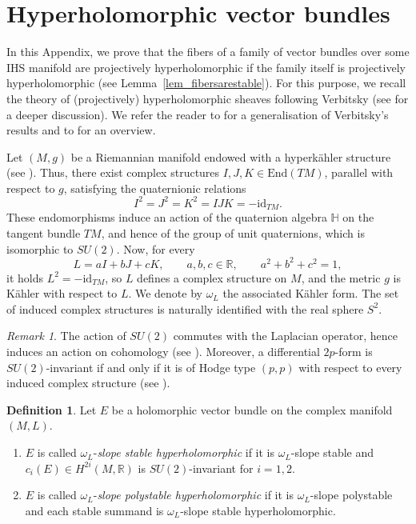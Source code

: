 \documentclass[12pt,a4paper]{amsart}
\theoremstyle{plain}
\theoremstyle{definition}
\newtheorem{df}[thm]{Definition}
\theoremstyle{remark}
\newtheorem{rmk}[thm]{Remark}
\def\id{\mathrm{id}}
\def\End{\mathrm{End}}
\def\H{H}
\begin{document}
\appendix

\section{Hyperholomorphic vector bundles} \label{app_hyperholo}

In this Appendix, we prove that the fibers of a family of vector bundles over some IHS manifold are projectively hyperholomorphic if the family itself is projectively hyperholomorphic (see Lemma~\ref{lem_fibersarestable}).
For this purpose, we recall the theory of (projectively) hyperholomorphic sheaves following Verbitsky (see \cite{verbitsky-hyperholomorphic-sheaves} for a deeper discussion). We refer the reader to \cite{markman_bbf} for a generalisation of Verbitsky's results and to \cite{bottini-macri-stellari-hk-varieties} for an overview.

Let $(M,g)$ be a Riemannian manifold endowed with a hyperk\"ahler structure (see \cite[Definition~2.1]{verbitsky-hyperholomorphic-sheaves}). Thus, there exist complex structures $I,J,K\in\End(TM)$, parallel with respect to $g$, satisfying the quaternionic relations
\[
I^2=J^2=K^2=IJK=-\id_{TM}.
\]
These endomorphisms induce an action of the quaternion algebra $\mathbb{H}$ on the tangent bundle $TM$, and hence of the group of unit quaternions, which is isomorphic to $SU(2)$. Now, for every
\[
L=aI+bJ+cK, \qquad a,b,c\in\mathbb{R}, \qquad a^2+b^2+c^2=1,
\]
it holds $L^2=-\id_{TM}$, so $L$ defines a complex structure on $M$, and the metric $g$ is K\"ahler with respect to $L$. We denote by $\omega_L$ the associated K\"ahler form. The set of induced complex structures is naturally identified with the real sphere $S^2$.

\begin{rmk}
The action of $SU(2)$ commutes with the Laplacian operator, hence induces an action on cohomology (see \cite[Lemma~2.5]{verbitsky-hyperholomorphic-sheaves}). Moreover, a differential $2p$-form is $SU(2)$-invariant if and only if it is of Hodge type $(p,p)$ with respect to every induced complex structure (see \cite[Lemma~2.6]{verbitsky-hyperholomorphic-sheaves}).
\end{rmk}
\begin{df} Let $E$ be a holomorphic vector bundle on the complex manifold $(M,L)$. \begin{enumerate}
    \item $E$ is called $\omega_{L}$-\textit{slope stable hyperholomorphic} if it is $\omega_L$-slope stable and $c_i(E)\in \H^{2i}(M,\mathbb{R})$ is $SU(2)$-invariant for $i=1,2$. 
    \item  $E$ is called $\omega_L$-\textit{slope polystable hyperholomorphic} if it is $\omega_L$-slope polystable and each stable summand is $\omega_L$-slope stable hyperholomorphic.
\end{enumerate}
\end{df}
\end{document}
